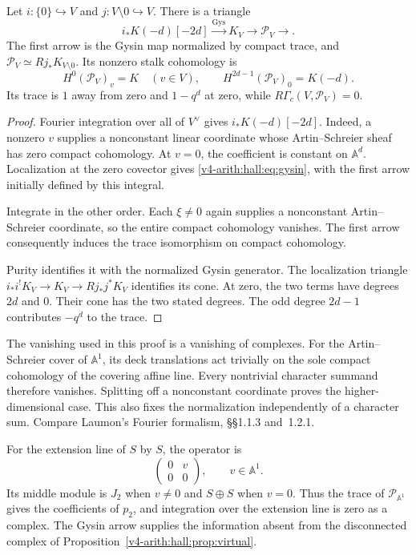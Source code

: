 \begin{theorem}\label{v4-arith:hall:thm:fourier-primitive}
Let $i:\{0\}\hookrightarrow V$ and
$j:V\setminus0\hookrightarrow V$. There is a triangle
\begin{equation}\label{v4-arith:hall:eq:gysin}
 i_*K(-d)[-2d]\xrightarrow{\mathrm{Gys}}K_V
 \longrightarrow\mathcal P_V\longrightarrow.
\end{equation}
The first arrow is the Gysin map normalized by compact trace,
and $\mathcal P_V\simeq Rj_*K_{V\setminus0}$.
Its nonzero stalk cohomology is
\[
 H^0(\mathcal P_V)_v=K\quad(v\in V),\qquad
 H^{2d-1}(\mathcal P_V)_0=K(-d).
\]
Its trace is $1$ away from zero and $1-q^d$ at zero, while
$R\Gamma_c(V,\mathcal P_V)=0$.
\end{theorem}
\begin{proof}
Fourier integration over all of $V^\vee$ gives
$i_*K(-d)[-2d]$. Indeed, a nonzero $v$ supplies a nonconstant
linear coordinate whose Artin--Schreier sheaf has zero compact
cohomology. At $v=0$, the coefficient is constant on $\mathbb A^d$.
Localization at the zero covector gives
\eqref{v4-arith:hall:eq:gysin}, with the first arrow initially
defined by this integral.

Integrate in the other order. Each $\xi\ne0$ again supplies a
nonconstant Artin--Schreier coordinate, so the entire compact
cohomology vanishes. The first arrow consequently induces the
trace isomorphism on compact cohomology.


Purity identifies it
with the normalized Gysin generator. The localization triangle
$i_*i^!K_V\to K_V\to Rj_*j^*K_V$ identifies its cone.
At zero, the two terms have degrees $2d$ and $0$. Their cone
has the two stated degrees. The odd degree $2d-1$ contributes
$-q^d$ to the trace.
\end{proof}

The vanishing used in this proof is a vanishing of complexes.
For the Artin--Schreier cover of $\mathbb A^1$, its deck translations
act trivially on the sole compact cohomology of the covering affine
line. Every nontrivial character summand therefore vanishes.
Splitting off a nonconstant coordinate proves the higher-dimensional
case. This also fixes the normalization independently of a character
sum. Compare Laumon's Fourier formalism, \S\S1.1.3 and~1.2.1.

For the extension line of $S$ by $S$, the operator is
\[
 \begin{pmatrix}0&v\\0&0\end{pmatrix},\qquad v\in\mathbb A^1.
\]
Its middle module is $J_2$ when $v\ne0$ and $S\oplus S$ when
$v=0$. Thus the trace of $\mathcal P_{\mathbb A^1}$ gives the
coefficients of $p_2$, and integration over the extension line is
zero as a complex. The Gysin arrow supplies the information absent
from the disconnected complex of Proposition~\ref{v4-arith:hall:prop:virtual}.

